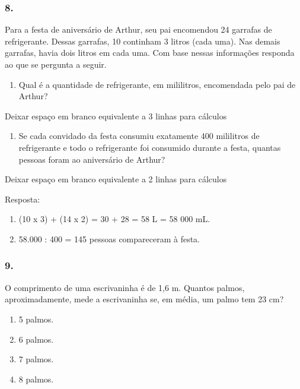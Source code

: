 \begin{enumerate}
\begin{escolha}
\begin{enumerate}
\begin{itemize}
\begin{itemize}
\begin{escolha}
\subsubsection{8.}\label{section-46}

Para a festa de aniversário de Arthur, seu pai encomendou 24 garrafas de
refrigerante. Dessas garrafas, 10 continham 3 litros (cada uma). Nas
demais garrafas, havia dois litros em cada uma. Com base nessas
informações responda ao que se pergunta a seguir.

\begin{enumerate}
\def\labelenumi{\alph{enumi})}
\item
  Qual é a quantidade de refrigerante, em mililitros, encomendada pelo pai de Arthur?
\end{enumerate}

Deixar espaço em branco equivalente a 3 linhas para cálculos

\begin{enumerate}
\def\labelenumi{\alph{enumi})}
\item
  Se cada convidado da festa consumiu exatamente 400 mililitros de refrigerante e
  todo o refrigerante foi consumido durante a festa, quantas pessoas
  foram ao aniversário de Arthur?
\end{enumerate}

Deixar espaço em branco equivalente a 2 linhas para cálculos

Resposta:

\begin{enumerate}
\def\labelenumi{\alph{enumi})}
\item
  (10 x 3) + (14 x 2) = 30 + 28 = 58 L = 58 000 mL.
\item
  58.000 : 400 = 145 pessoas compareceram à festa.
\end{enumerate}

\subsubsection{9.}\label{section-47}

O comprimento de uma escrivaninha é de 1,6 m. Quantos palmos,
aproximadamente, mede a escrivaninha se, em média, um palmo tem 23 cm?

\begin{enumerate}
\def\labelenumi{\alph{enumi})}
\item
  5 palmos.
\item
  6 palmos.
\item
  7 palmos.
\item
  8 palmos.
\end{enumerate}


\end{escolha}
\end{itemize}
\end{itemize}
\end{enumerate}
\end{escolha}
\end{enumerate}

